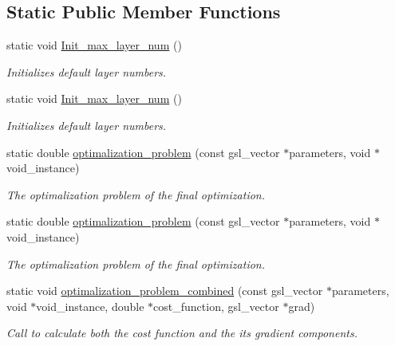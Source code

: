 \subsection*{Static Public Member Functions}
\begin{DoxyCompactItemize}
\item 
static void \hyperlink{class_decomposition___base_a24c7d112a4f3b2346c3d885316f3bfa1}{Init\+\_\+max\+\_\+layer\+\_\+num} ()
\begin{DoxyCompactList}\small\item\em Initializes default layer numbers. \end{DoxyCompactList}\item 
static void \hyperlink{class_decomposition___base_abdb59c6b355a338eb958f58d6f28b966}{Init\+\_\+max\+\_\+layer\+\_\+num} ()
\begin{DoxyCompactList}\small\item\em Initializes default layer numbers. \end{DoxyCompactList}\item 
static double \hyperlink{class_sub___matrix___decomposition_a37b3fe87c937cc47590646a2ac901f54}{optimalization\+\_\+problem} (const gsl\+\_\+vector $\ast$parameters, void $\ast$void\+\_\+instance)
\begin{DoxyCompactList}\small\item\em The optimalization problem of the final optimization. \end{DoxyCompactList}\item 
static double \hyperlink{class_sub___matrix___decomposition_a3270d215316879d7300d40637958ba0c}{optimalization\+\_\+problem} (const gsl\+\_\+vector $\ast$parameters, void $\ast$void\+\_\+instance)
\begin{DoxyCompactList}\small\item\em The optimalization problem of the final optimization. \end{DoxyCompactList}\item 
static void \hyperlink{class_sub___matrix___decomposition_a5509def527f89c880a5d043f65f78c05}{optimalization\+\_\+problem\+\_\+combined} (const gsl\+\_\+vector $\ast$parameters, void $\ast$void\+\_\+instance, double $\ast$cost\+\_\+function, gsl\+\_\+vector $\ast$grad)
\begin{DoxyCompactList}\small\item\em Call to calculate both the cost function and the its gradient components. \end{DoxyCompactList}\item 

\end{DoxyCompactItemize}
